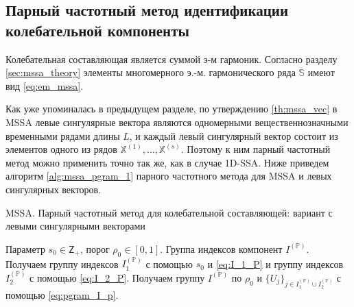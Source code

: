 \documentclass[specialist,
               substylefile = spbu.rtx,
               subf,href,colorlinks=true, 12pt]{disser}
\newtheorem{remark}{Замечание}
\begin{document}
\newpage
\subsection{Парный частотный метод идентификации колебательной компоненты}
Колебательная составляющая является суммой э-м гармоник.
Согласно разделу \ref{sec:mssa_theory} элементы многомерного э.-м. гармонического ряда $\mathbb{S}$ имеют вид \eqref{eq:em_mssa}.

%
%
%

Как уже упоминалась в предыдущем разделе, по утверждению \ref{th:mssa_vec} в MSSA левые сингулярные вектора являются одномерными вещественнозначными временными рядами длины $L$, и каждый левый сингулярный вектор состоит из элементов одного из 
рядов $\mathbb{X}^{(1)}, \ldots, \mathbb{X}^{(s)}$. Поэтому к ним парный частотный метод можно применить точно так же, как в случае 1D-SSA. Ниже приведем алгоритм \ref{alg:mssa_pgram_1} парного частотного метода для MSSA и левых сингулярных векторов.

\begin{algorithm}[!hhh]
\caption{MSSA. Парный частотный метод для колебательной составляющей: вариант с левыми сингулярными векторами}
\label{alg:mssa_pgram_1}
\begin{algorithmic}[1]
\REQUIRE Параметр $s_0 \in \mathsf{Z}_{+}$, порог $\rho_0 \in [0,1]$.
\ENSURE Группа индексов компонент $I^{(\mathbb{P})}$.
\STATE  Получаем группу индексов $I_1^{(\mathbb{P})}$ с помощью $s_0$ и \eqref{eq:I_1_P} и группу индексов $I_2^{(\mathbb{P})}$ с помощью \eqref{eq:I_2_P}.
\STATE Получаем группу $I^{(\mathbb{P})}$ по $\rho_0$ и $\{U_j\}_{j \in I_1^{(\mathbb{P})} \cup I_2^{(\mathbb{P})}}$ с помощью  \eqref{eq:pgram_I_p}.
\end{algorithmic}
\end{algorithm}
\end{document}
